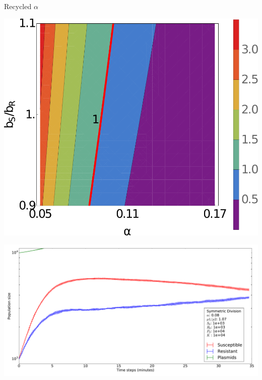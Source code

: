 \documentclass[final]{beamer}
\newlength{\onecolwid}
\newlength{\figwid}
\begin{document}
\begin{frame}[t]
\begin{block}
\begin{columns}[t]
\begin{column}{\onecolwid}
  \begin{block}{Recycled $\alpha$}
    \begin{center}
      \includegraphics[width=\figwid]{../dev/graphics/poster/recycled_contour.pdf}

      \includegraphics[width=\figwid]{../dev/graphics/poster/recycled_pop.pdf}
    \end{center}


\end{block}
\end{column}
\end{columns}
\end{block}
\end{frame}
\end{document}
